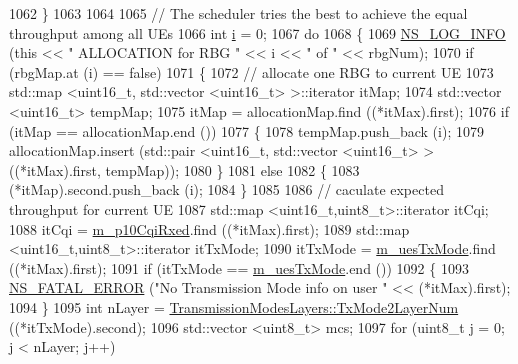 \begin{DoxyCode}
1062         \}
1063 
1064 
1065       \textcolor{comment}{// The scheduler tries the best to achieve the equal throughput among all UEs}
1066       \textcolor{keywordtype}{int} \hyperlink{bernuolliDistribution_8m_a6f6ccfcf58b31cb6412107d9d5281426}{i} = 0;
1067       \textcolor{keywordflow}{do} 
1068         \{
1069           \hyperlink{group__logging_gafbd73ee2cf9f26b319f49086d8e860fb}{NS\_LOG\_INFO} (\textcolor{keyword}{this} << \textcolor{stringliteral}{" ALLOCATION for RBG "} << i << \textcolor{stringliteral}{" of "} << rbgNum);
1070           \textcolor{keywordflow}{if} (rbgMap.at (i) == \textcolor{keyword}{false})
1071             \{
1072               \textcolor{comment}{// allocate one RBG to current UE}
1073               std::map <uint16\_t, std::vector <uint16\_t> >::iterator itMap;
1074               std::vector <uint16\_t> tempMap;
1075               itMap = allocationMap.find ((*itMax).first);
1076               \textcolor{keywordflow}{if} (itMap == allocationMap.end ())
1077                 \{
1078                   tempMap.push\_back (i);
1079                   allocationMap.insert (std::pair <uint16\_t, std::vector <uint16\_t> > ((*itMax).first, 
      tempMap));
1080                 \}
1081               \textcolor{keywordflow}{else}
1082                 \{
1083                   (*itMap).second.push\_back (i);
1084                 \}
1085 
1086               \textcolor{comment}{// caculate expected throughput for current UE}
1087               std::map <uint16\_t,uint8\_t>::iterator itCqi;
1088               itCqi = \hyperlink{classns3_1_1FdBetFfMacScheduler_a122fbac27516524b54245db095d9162c}{m\_p10CqiRxed}.find ((*itMax).first);
1089               std::map <uint16\_t,uint8\_t>::iterator itTxMode;
1090               itTxMode = \hyperlink{classns3_1_1FdBetFfMacScheduler_a1a3c593a10fbac9008cb1b991746dda2}{m\_uesTxMode}.find ((*itMax).first);
1091               \textcolor{keywordflow}{if} (itTxMode == \hyperlink{classns3_1_1FdBetFfMacScheduler_a1a3c593a10fbac9008cb1b991746dda2}{m\_uesTxMode}.end ())
1092                 \{
1093                   \hyperlink{group__fatal_ga5131d5e3f75d7d4cbfd706ac456fdc85}{NS\_FATAL\_ERROR} (\textcolor{stringliteral}{"No Transmission Mode info on user "} << (*itMax).first);
1094                 \}
1095               \textcolor{keywordtype}{int} nLayer = \hyperlink{classns3_1_1TransmissionModesLayers_a31f608b7bfaa77440fe4cb85ad035329}{TransmissionModesLayers::TxMode2LayerNum}
       ((*itTxMode).second);
1096               std::vector <uint8\_t> mcs;
1097               \textcolor{keywordflow}{for} (uint8\_t j = 0; j < nLayer; j++) 

\end{DoxyCode}
